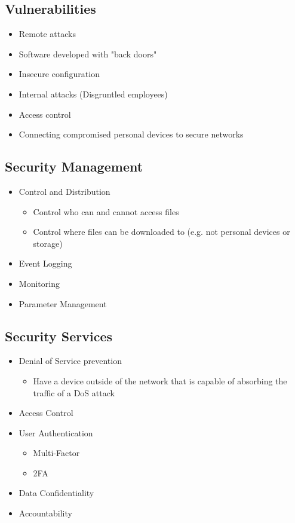 
\subsection*{Vulnerabilities}

\begin{itemize}
  \item Remote attacks
  \item Software developed with "back doors"
  \item Insecure configuration
  \item Internal attacks (Disgruntled employees)
  \item Access control
  \item Connecting compromised personal devices to secure networks
\end{itemize}

\subsection*{Security Management}

\begin{itemize}
  \item Control and Distribution
  \begin{itemize}
    \item Control who can and cannot access files
    \item Control where files can be downloaded to (e.g. not personal devices or storage)
  \end{itemize}
  \item Event Logging
  \item Monitoring
  \item Parameter Management
\end{itemize}

\subsection*{Security Services}

\begin{itemize}
  \item Denial of Service prevention
  \begin{itemize}
    \item Have a device outside of the network that is capable of absorbing the traffic of a DoS attack
  \end{itemize}
  \item Access Control
  \item User Authentication
  \begin{itemize}
    \item Multi-Factor
    \item 2FA
  \end{itemize}
  \item Data Confidentiality
  \item Accountability
\end{itemize}

